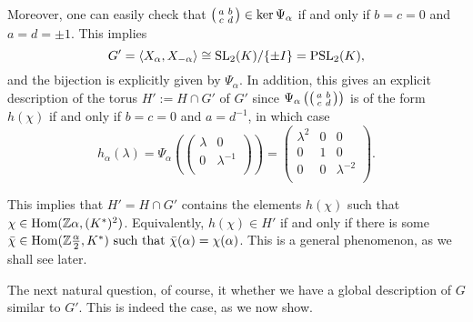 Moreover, one can easily check that $\begin{psmallmatrix}
    a&b\\
    c&d\\
\end{psmallmatrix}\in\ker\Psi_\alpha$ if and only if $b=c=0$ and $a=d=\pm{1}$. This implies
$$G'=\langle X_\alpha,X_{-\alpha}\rangle\cong\mathrm{SL}_2(K)/\{\pm I\}=\mathrm{PSL}_2(K),$$
and the bijection is explicitly given by $\Psi_\alpha$. In addition, this gives an explicit description of the torus $H':=H\cap G'$ of $G'$ since $\Psi_\alpha\left(\begin{psmallmatrix}
    a&b\\
    c&d\\
\end{psmallmatrix}\right)$ is of the form $h(\chi)$ if and only if $b=c=0$ and $a=d^{-1}$, in which case 
$$h_\alpha(\lambda)=\Psi_\alpha\left(\begin{pmatrix}
    \lambda & 0\\
    0 & \lambda^{-1}\\
\end{pmatrix}\right)=\begin{pmatrix}
    \lambda^2 & 0 & 0\\
    0 & 1 & 0\\
    0 & 0 & \lambda^{-2}\\
\end{pmatrix}.$$

This implies that $H'=H\cap G'$ contains the elements $h(\chi)$ such that $\chi\in\mathrm{Hom}(\mathbb{Z}\alpha,(K^*)^2)$. Equivalently, $h(\chi)\in H'$ if and only if there is some $\bar\chi\in\mathrm{Hom}(\mathbb{Z}\frac{\alpha}{2},K^*)\text{ such that }\bar\chi(\alpha)=\chi(\alpha)$. This is a general phenomenon, as we shall see later.

The next natural question, of course, it whether we have a global description of $G$ similar to $G'$. This is indeed the case, as we now show.

